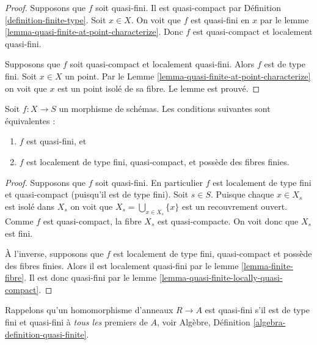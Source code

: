 \begin{proof}
Supposons que $f$ soit quasi-fini. Il est quasi-compact
par Définition \ref{definition-finite-type}. Soit $x \in X$.
On voit que $f$ est quasi-fini
en $x$ par le lemme \ref{lemma-quasi-finite-at-point-characterize}. Donc $f$
est quasi-compact et localement quasi-fini.

\medskip\noindent
Supposons que $f$ soit quasi-compact et localement
quasi-fini. Alors $f$ est de type fini.
Soit $x \in X$ un point. Par le Lemme \ref{lemma-quasi-finite-at-point-characterize} on voit
que $x$ est un point isolé de sa fibre. Le
lemme est prouvé.
\end{proof}

\begin{lemma}
\label{lemma-quasi-finite}
Soit $f : X \to S$ un morphisme de schémas. Les conditions
suivantes sont équivalentes :
\begin{enumerate}
\item $f$ est quasi-fini, et
\item $f$ est localement de type fini, quasi-compact, et possède des fibres finies.
\end{enumerate}
\end{lemma}

\begin{proof}
Supposons que $f$ soit quasi-fini. En particulier $f$ est localement
de type fini et quasi-compact (puisqu'il est de type fini). Soit $s \in S$.
Puisque chaque $x \in X_s$ est isolé dans $X_s$ on
voit que $X_s = \bigcup_{x \in X_s} \{x\}$ est un recouvrement ouvert. Comme $f$ est
quasi-compact, la fibre $X_s$ est quasi-compacte. On voit donc que
$X_s$ est fini.

\medskip\noindent
À l'inverse, supposons que $f$ est localement de type
fini, quasi-compact et possède des fibres finies. Alors
il est localement quasi-fini par le lemme \ref{lemma-finite-fibre}.
Il est donc quasi-fini par le lemme \ref{lemma-quasi-finite-locally-quasi-compact}.
\end{proof}

\noindent
Rappelons qu'un homomorphisme d'anneaux $R \to A$ est quasi-fini
s'il est de type fini et quasi-fini à {\it tous les}
premiers de $A$, voir Algèbre, Définition \ref{algebra-definition-quasi-finite}.


